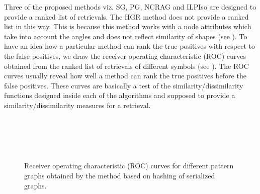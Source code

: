 Three of the proposed methods viz. SG, PG, NCRAG and ILPIso are designed to provide a ranked list of retrievals. The HGR method does not provide a ranked list in this way. This is because this method works with a node attributes which take into account the angles and does not reflect similarity of shapes (see ). To have an idea how a particular method can rank the true positives with respect to the false positives, we draw the receiver operating characteristic (ROC) curves obtained from the ranked list of retrievals of different symbols (see ). The ROC curves usually reveal how well a method can rank the true positives before the false positives. These curves are basically a test of the similarity/dissimilarity functions designed inside each of the algorithms and supposed to provide a similarity/dissimilarity measures for a retrieval.

\begin{figure}[!bh]
\begin{center}
\hspace{0.1cm}
\hspace{0.1cm}
\\
\hspace{0.1cm}
\hspace{0.1cm}
\\
\hspace{0.1cm}
\hspace{0.1cm}
\end{center}
\end{figure}
\begin{figure}[!th]
\begin{center}
\hspace{0.1cm}
\hspace{0.1cm}
\\
\hspace{0.1cm}
\hspace{0.1cm}
\end{center}
\caption{Receiver operating characteristic (ROC) curves for different pattern graphs obtained by the method based on hashing of serialized graphs.}
\label{fig:experiments:roc}
\end{figure}

